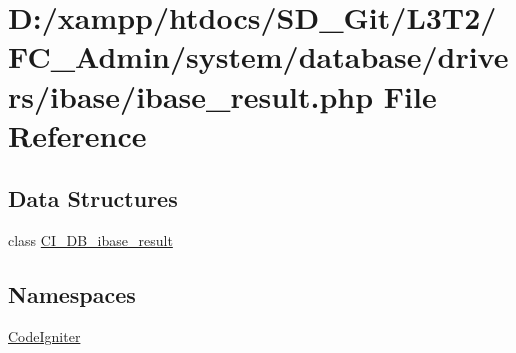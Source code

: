 \hypertarget{ibase__result_8php}{}\section{D\+:/xampp/htdocs/\+S\+D\+\_\+\+Git/\+L3\+T2/\+F\+C\+\_\+\+Admin/system/database/drivers/ibase/ibase\+\_\+result.php File Reference}
\label{ibase__result_8php}
\subsection*{Data Structures}
\begin{DoxyCompactItemize}
\item 
class \hyperlink{class_c_i___d_b__ibase__result}{C\+I\+\_\+\+D\+B\+\_\+ibase\+\_\+result}
\end{DoxyCompactItemize}
\subsection*{Namespaces}
\begin{DoxyCompactItemize}
\item 
 \hyperlink{namespace_code_igniter}{Code\+Igniter}
\end{DoxyCompactItemize}
